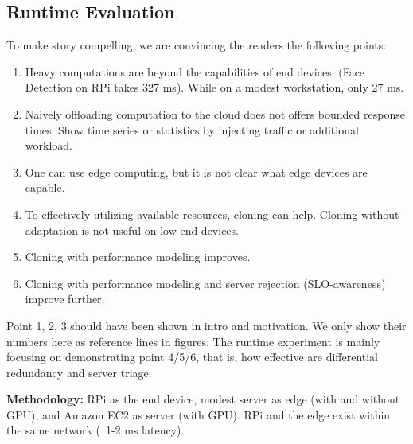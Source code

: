 \newpage

\subsection{Runtime Evaluation}
\label{sec:runtime}

To make \sysname{} story compelling, we are convincing the readers the following
points:

\begin{enumerate}[leftmargin=*, itemsep=5pt]
\item Heavy computations are beyond the capabilities of end devices. (Face
  Detection on RPi takes 327 ms). While on a modest workstation, only 27 ms.
\item Naively offloading computation to the cloud does not offers bounded
  response times. Show time series or statistics by injecting traffic or
  additional workload.
\item One can use edge computing, but it is not clear what edge devices are
  capable.
\item To effectively utilizing available resources, cloning can help. Cloning
  without adaptation is not useful on low end devices.
\item Cloning with performance modeling improves.
\item Cloning with performance modeling and server rejection (SLO-awareness)
  improve further.
\end{enumerate}

Point 1, 2, 3 should have been shown in intro and motivation. We only show their
numbers here as reference lines in figures. The runtime experiment is mainly
focusing on demonstrating point 4/5/6, that is, how effective are differential
redundancy and server triage.

\textbf{Methodology:} RPi as the end device, modest server as edge (with and
without GPU), and Amazon EC2 as server (with GPU). RPi and the edge exist within
the same network (~1-2 ms latency).

